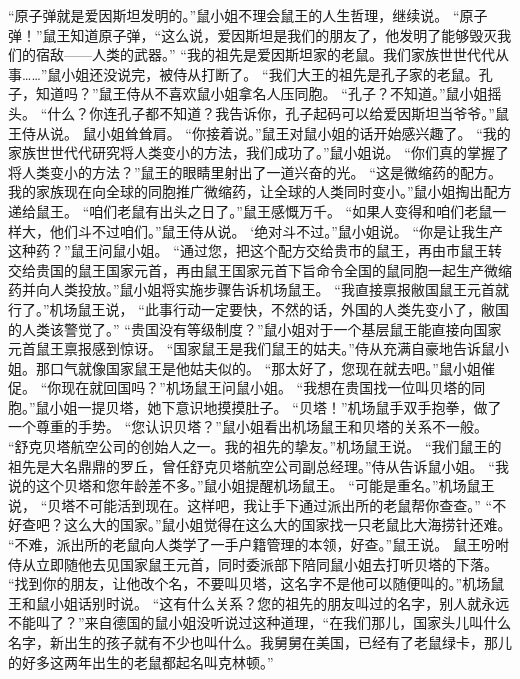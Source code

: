 \documentclass[a4paper,12pt,UTF8,twoside]{ctexbook}
\begin{document}
        “原子弹就是爱因斯坦发明的。”鼠小姐不理会鼠王的人生哲理，继续说。  
        “原子弹！”鼠王知道原子弹，“这么说，爱因斯坦是我们的朋友了，他发明了能够毁灭我们的宿敌——人类的武器。”  
        “我的祖先是爱因斯坦家的老鼠。我们家族世世代代从事……”鼠小姐还没说完，被侍从打断了。  
        “我们大王的祖先是孔子家的老鼠。孔子，知道吗？”鼠王侍从不喜欢鼠小姐拿名人压同胞。  
        “孔子？不知道。”鼠小姐摇头。  
        “什么？你连孔子都不知道？我告诉你，孔子起码可以给爱因斯坦当爷爷。”鼠王侍从说。  
        鼠小姐耸耸肩。  
        “你接着说。”鼠王对鼠小姐的话开始感兴趣了。  
        “我的家族世世代代研究将人类变小的方法，我们成功了。”鼠小姐说。        
        “你们真的掌握了将人类变小的方法？”鼠王的眼睛里射出了一道兴奋的光。  
        “这是微缩药的配方。我的家族现在向全球的同胞推广微缩药，让全球的人类同时变小。”鼠小姐掏出配方递给鼠王。  
        “咱们老鼠有出头之日了。”鼠王感慨万千。  
        “如果人变得和咱们老鼠一样大，他们斗不过咱们。”鼠王侍从说。  
        ‘绝对斗不过。”鼠小姐说。  
        “你是让我生产这种药？”鼠王问鼠小姐。  
        “通过您，把这个配方交给贵市的鼠王，再由市鼠王转交给贵国的鼠王国家元首，再由鼠王国家元首下旨命令全国的鼠同胞一起生产微缩药并向人类投放。”鼠小姐将实施步骤告诉机场鼠王。  
        “我直接禀报敝国鼠王元首就行了。”机场鼠王说，  “此事行动一定要快，不然的话，外国的人类先变小了，敝国的人类该警觉了。”  
        “贵国没有等级制度？”鼠小姐对于一个基层鼠王能直接向国家元首鼠王禀报感到惊讶。  
        “国家鼠王是我们鼠王的姑夫。”侍从充满自豪地告诉鼠小姐。那口气就像国家鼠王是他姑夫似的。  
        “那太好了，您现在就去吧。”鼠小姐催促。  
        “你现在就回国吗？”机场鼠王问鼠小姐。  
        “我想在贵国找一位叫贝塔的同胞。”鼠小姐一提贝塔，她下意识地摸摸肚子。  
        “贝塔！”机场鼠手双手抱拳，做了一个尊重的手势。  
        “您认识贝塔？”鼠小姐看出机场鼠王和贝塔的关系不一般。  
        “舒克贝塔航空公司的创始人之一。我的祖先的挚友。”机场鼠王说。  
        “我们鼠王的祖先是大名鼎鼎的罗丘，曾任舒克贝塔航空公司副总经理。”侍从告诉鼠小姐。  
        “我说的这个贝塔和您年龄差不多。”鼠小姐提醒机场鼠王。  
        “可能是重名。”机场鼠王说，  “贝塔不可能活到现在。这样吧，我让手下通过派出所的老鼠帮你查查。”  
        “不好查吧？这么大的国家。”鼠小姐觉得在这么大的国家找一只老鼠比大海捞针还难。  
        “不难，派出所的老鼠向人类学了一手户籍管理的本领，好查。”鼠王说。  
        鼠王吩咐侍从立即随他去见国家鼠王元首，同时委派部下陪同鼠小姐去打听贝塔的下落。  
        “找到你的朋友，让他改个名，不要叫贝塔，这名字不是他可以随便叫的。”机场鼠王和鼠小姐话别时说。  
        “这有什么关系？您的祖先的朋友叫过的名字，别人就永远不能叫了？”来自德国的鼠小姐没听说过这种道理，“在我们那儿，国家头儿叫什么名字，新出生的孩子就有不少也叫什么。我舅舅在美国，已经有了老鼠绿卡，那儿的好多这两年出生的老鼠都起名叫克林顿。”  
\end{document}
